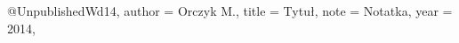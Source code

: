 
@Unpublished{Wd14,
  author = 	 {Orczyk M.},
  title = 	 {Tytuł},
  note = 	 {Notatka},
  year = 	 {2014},
}
